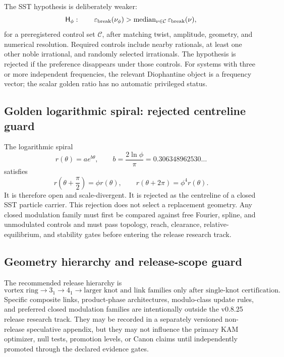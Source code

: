 The SST hypothesis is deliberately weaker:
\begin{equation}
    \mathsf H_{\phi}:
    \qquad
    \varepsilon_{\rm break}(\nu_{\phi})
    >
    \operatorname{median}_{\nu\in\mathcal C}
    \varepsilon_{\rm break}(\nu),
    \label{eq:rt_kam_golden_break_hypothesis}
\end{equation}
for a preregistered control set \(\mathcal C\), after matching twist,
amplitude, geometry, and numerical resolution.  Required controls include
nearby rationals, at least one other noble irrational, and randomly selected
irrationals.  The hypothesis is rejected if the preference disappears under
those controls.  For systems with three or more independent frequencies, the
relevant Diophantine object is a frequency vector; the scalar golden ratio has
no automatic privileged status.

\subsection{Golden logarithmic spiral: rejected centreline guard}
\label{subsec:rt_kam_golden_spiral_guard}

The logarithmic spiral
\begin{equation}
    r(\theta)
    =
    a e^{b\theta},
    \qquad
    b
    =
    \frac{2\ln\phi}{\pi}
    =
    0.306348962530\ldots
    \label{eq:rt_kam_golden_log_spiral}
\end{equation}
satisfies
\begin{equation}
    r\!\left(\theta+\frac{\pi}{2}\right)
    =
    \phi r(\theta),
    \qquad
    r(\theta+2\pi)
    =
    \phi^4r(\theta).
    \label{eq:rt_kam_golden_spiral_scaling}
\end{equation}
It is therefore open and scale-divergent.  It is rejected as the centreline of
a closed SST particle carrier.  This rejection does not select a replacement
geometry.  Any closed modulation family must first be compared against free
Fourier, spline, and unmodulated controls and must pass topology, reach,
clearance, relative-equilibrium, and stability gates before entering the
release research track.

\subsection{Geometry hierarchy and release-scope guard}
\label{subsec:rt_kam_geometry_scope_guard}

The recommended release hierarchy is
\begin{equation}
    \text{vortex ring}
    \longrightarrow
    3_1
    \longrightarrow
    4_1
    \longrightarrow
    \text{larger knot and link families only after single-knot certification}.
    \label{eq:rt_kam_geometry_hierarchy}
\end{equation}
Specific composite links, product-phase architectures, modulo-class update
rules, and preferred closed modulation families are intentionally outside the
v0.8.25 release research track.  They may be recorded in a separately
versioned non-release speculative appendix, but they may not influence the
primary KAM optimizer, null tests, promotion levels, or Canon claims until
independently promoted through the declared evidence gates.

